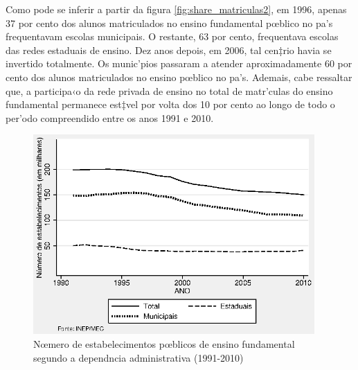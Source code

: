 \documentclass[a4paper, 12pt]{article}
\begin{document}



Como pode se inferir a partir da figura \ref{fig:share_matriculas2}, em 1996, apenas 37 por cento dos alunos matriculados no ensino fundamental pœblico no pa’s frequentavam escolas municipais. O restante, 63 por cento, frequentava escolas das redes estaduais de ensino. Dez anos depois, em 2006, tal cen‡rio havia se invertido totalmente. Os munic’pios passaram a atender aproximadamente 60 por cento dos alunos matriculados no ensino pœblico no pa’s. Ademais, cabe ressaltar que, a participa‹o da rede privada de ensino no total de matr’culas do ensino fundamental permanece est‡vel por volta dos 10 por cento ao longo de todo o per’odo compreendido entre os anos 1991 e 2010.



\vspace*{1cm} 

\begin{figure}[h]
\centering
\begin{footnotesize}
\caption{Nœmero de estabelecimentos pœblicos de ensino fundamental  
\newline segundo a dependncia administrativa (1991-2010)} 
\label{fig:estabelecimentos}                             
 \includegraphics[height=3in]{estabelecimentos}
\end{footnotesize}
\end{figure}
 

\end{document}
